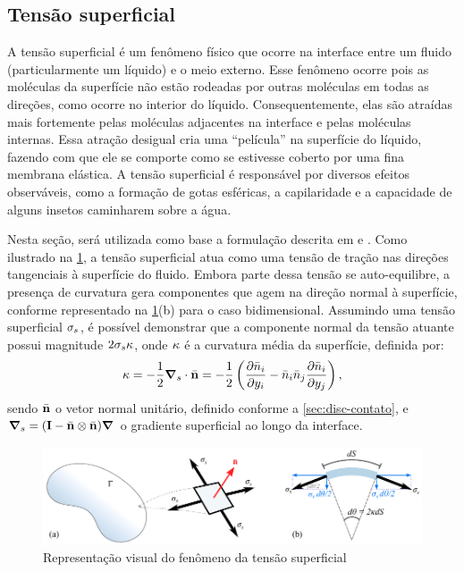 \documentclass[Tese.tex]{subfiles}
\begin{document}
\subsection{Tensão superficial}

A tensão superficial é um fenômeno físico que ocorre na interface entre um fluido (particularmente um líquido) e o meio externo. Esse fenômeno ocorre pois as moléculas da superfície não estão rodeadas por outras moléculas em todas as direções, como ocorre no interior do líquido. Consequentemente, elas são atraídas mais fortemente pelas moléculas adjacentes na interface e pelas moléculas internas. Essa atração desigual cria uma ``película'' na superfície do líquido, fazendo com que ele se comporte como se estivesse coberto por uma fina membrana elástica. A tensão superficial é responsável por diversos efeitos observáveis, como a formação de gotas esféricas, a capilaridade e a capacidade de alguns insetos caminharem sobre a água. 

Nesta seção, será utilizada como base a formulação descrita em  e . Como ilustrado na \cref{fig:SurfaceTension}, a tensão superficial atua como uma tensão de tração nas direções tangenciais à superfície do fluido. Embora parte dessa tensão se auto-equilibre, a presença de curvatura gera componentes que agem na direção normal à superfície, conforme representado na \cref{fig:SurfaceTension}(b) para o caso bidimensional. Assumindo uma tensão superficial $\sigma_s$, é possível demonstrar que a componente normal da tensão atuante possui magnitude $2\sigma_s\kappa$, onde $\kappa$ é a curvatura média da superfície, definida por:
\begin{equation}
\kappa = -\dfrac{1}{2}\boldsymbol{\nabla}_s\cdot\bar{\mathbf{n}} = -\dfrac{1}{2}\left(\dfrac{\partial\bar{{n}}_i}{\partial y_i} - \bar{{n}}_i\bar{{n}}_j\dfrac{\partial\bar{{n}}_i}{\partial y_j} \right),
\end{equation}
sendo $\bar{\mathbf{n}}$ o vetor normal unitário, definido conforme a \cref{sec:disc-contato}, e $\boldsymbol{\nabla}_s = (\mathbf{I} - \bar{\mathbf{n}}\otimes\bar{\mathbf{n}})\boldsymbol{\nabla}$ o gradiente superficial ao longo da interface.

\begin{figure}[!htb]
	\centering
	\caption{Representação visual do fenômeno da tensão superficial}
	\label{fig:SurfaceTension}
	\includegraphics[scale=1]{Figuras/SurfaceTension.pdf}
\end{figure}
\end{document}
